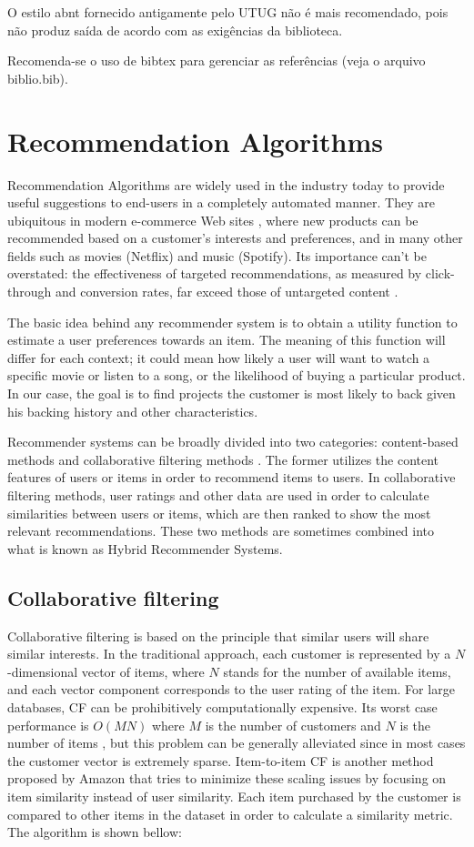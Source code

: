\documentclass[cic,tc,english]{iiufrgs}
\begin{document}
O estilo abnt fornecido antigamente pelo UTUG não é mais recomendado, pois não
produz saída de acordo com as exigências da biblioteca.

Recomenda-se o uso de bibtex para gerenciar as referências (veja o arquivo
biblio.bib).

\chapter{Recommendation Algorithms}
Recommendation Algorithms are widely used in the industry today to provide useful suggestions to end-users in a completely automated manner. They are ubiquitous in modern e-commerce Web sites \cite{Schafer2001}, where new products can be recommended based on a customer's interests and preferences, and in many other fields such as movies (Netflix) and music (Spotify). Its importance can't be overstated: the effectiveness of targeted recommendations, as measured by click-through and conversion rates, far exceed those of untargeted content \cite{Linden2003}.

The basic idea behind any recommender system is to obtain a utility function to estimate a user preferences towards an item. The meaning of this function will differ for each context; it could mean how likely a user will want to watch a specific movie or listen to a song, or the likelihood of buying a particular product. In our case, the goal is to find projects the customer is most likely to back given his backing history and other characteristics. 

Recommender systems can be broadly divided into two categories: content-based methods and collaborative filtering methods \cite{Rakesh2016}.
The former utilizes the content features of users or items in order to recommend items to users. In collaborative filtering methods, user ratings and other data are used in order to calculate similarities between users or items, which are then ranked to show the most relevant recommendations. These two methods are sometimes combined into what is known as Hybrid Recommender Systems.
\section{Collaborative filtering}
Collaborative filtering is based on the principle that similar users will share similar interests. In the traditional approach, each customer is represented by a \(N\)-dimensional vector of items, where \(N\) stands for the number of available items, and each vector component corresponds to the user rating of the item. For large databases, CF can be prohibitively computationally expensive. Its worst case performance is \(O(MN)\) where \(M\) is the number of customers and \(N\) is the number of items \cite{Linden2003}, but this problem can be generally alleviated since in most cases the customer vector is extremely sparse. Item-to-item CF is another method proposed by Amazon that tries to minimize these scaling issues by focusing on item similarity instead of user similarity. Each item purchased by the customer is compared to other items in the dataset in order to calculate a similarity metric. The algorithm is shown bellow:
\end{document}
